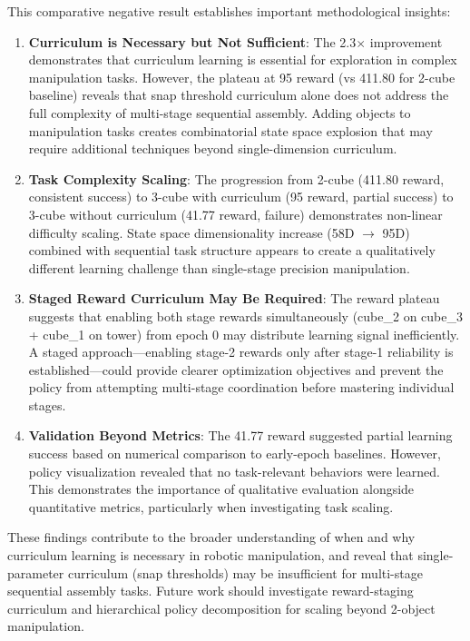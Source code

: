 \documentclass[12pt,a4paper,oneside]{report}
\begin{document}
This comparative negative result establishes important methodological insights:

\begin{enumerate}
    \item \textbf{Curriculum is Necessary but Not Sufficient}: The 2.3$\times$ improvement demonstrates that curriculum learning is essential for exploration in complex manipulation tasks. However, the plateau at 95 reward (vs 411.80 for 2-cube baseline) reveals that snap threshold curriculum alone does not address the full complexity of multi-stage sequential assembly. Adding objects to manipulation tasks creates combinatorial state space explosion that may require additional techniques beyond single-dimension curriculum.

    \item \textbf{Task Complexity Scaling}: The progression from 2-cube (411.80 reward, consistent success) to 3-cube with curriculum (95 reward, partial success) to 3-cube without curriculum (41.77 reward, failure) demonstrates non-linear difficulty scaling. State space dimensionality increase (58D $\rightarrow$ 95D) combined with sequential task structure appears to create a qualitatively different learning challenge than single-stage precision manipulation.

    \item \textbf{Staged Reward Curriculum May Be Required}: The reward plateau suggests that enabling both stage rewards simultaneously (cube\_2 on cube\_3 + cube\_1 on tower) from epoch 0 may distribute learning signal inefficiently. A staged approach---enabling stage-2 rewards only after stage-1 reliability is established---could provide clearer optimization objectives and prevent the policy from attempting multi-stage coordination before mastering individual stages.

    \item \textbf{Validation Beyond Metrics}: The 41.77 reward suggested partial learning success based on numerical comparison to early-epoch baselines. However, policy visualization revealed that no task-relevant behaviors were learned. This demonstrates the importance of qualitative evaluation alongside quantitative metrics, particularly when investigating task scaling.
\end{enumerate}

These findings contribute to the broader understanding of when and why curriculum learning is necessary in robotic manipulation, and reveal that single-parameter curriculum (snap thresholds) may be insufficient for multi-stage sequential assembly tasks. Future work should investigate reward-staging curriculum and hierarchical policy decomposition for scaling beyond 2-object manipulation.
\end{document}
